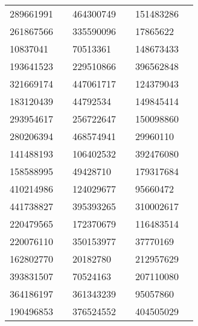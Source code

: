 \begin{longtable}{llllll}
289661991 & \cite{TIC_156648452} & 464300749 & \cite{TIC_464300749} & 151483286 & \cite{TIC_156648452} \\
261867566 & \cite{TIC_261867566} & 335590096 & \cite{TIC_335590096} & 17865622 & \cite{TIC_70524163} \\
10837041 & \cite{TIC_10837041} & 70513361 & \cite{TIC_70513361} & 148673433 & \cite{TIC_428699140} \\
193641523 & \cite{TIC_193641523} & 229510866 & \cite{TIC_376637093} & 396562848 & \cite{TIC_396562848} \\
321669174 & \cite{TIC_126606859} & 447061717 & \cite{TIC_447061717} & 124379043 & \cite{TIC_156648452} \\
183120439 & \cite{TIC_140691463} & 44792534 & \cite{TIC_44792534} & 149845414 & \cite{TIC_219016883} \\
293954617 & \cite{TIC_293954617} & 256722647 & \cite{TIC_348835438} & 150098860 & \cite{TIC_150098860} \\
280206394 & \cite{TIC_280206394} & 468574941 & \cite{TIC_376637093} & 29960110 & \cite{TIC_29960110} \\
141488193 & \cite{TIC_141488193} & 106402532 & \cite{TIC_106402532} & 392476080 & \cite{TIC_392476080} \\
158588995 & \cite{TIC_158588995} & 49428710 & \cite{TIC_219016883} & 179317684 & \cite{TIC_271893367} \\
410214986 & \cite{TIC_410214986} & 124029677 & \cite{TIC_124029677} & 95660472 & \cite{TIC_156648452} \\
441738827 & \cite{TIC_441738827} & 395393265 & \cite{TIC_394050135} & 310002617 & \cite{TIC_156648452} \\
220479565 & \cite{TIC_220479565} & 172370679 & \cite{TIC_172370679} & 116483514 & \cite{TIC_10837041} \\
220076110 & \cite{TIC_156648452} & 350153977 & \cite{TIC_350153977} & 37770169 & \cite{TIC_70513361} \\
162802770 & \cite{TIC_162802770} & 20182780 & \cite{TIC_20182780} & 212957629 & \cite{TIC_212957629} \\
393831507 & \cite{TIC_393831507} & 70524163 & \cite{TIC_70524163} & 207110080 & \cite{TIC_207110080} \\
364186197 & \cite{TIC_364186197} & 361343239 & \cite{TIC_156648452} & 95057860 & \cite{TIC_95057860} \\
190496853 & \cite{TIC_162802770} & 376524552 & \cite{TIC_394050135} & 404505029 & \cite{TIC_404505029} \\

\end{longtable}
